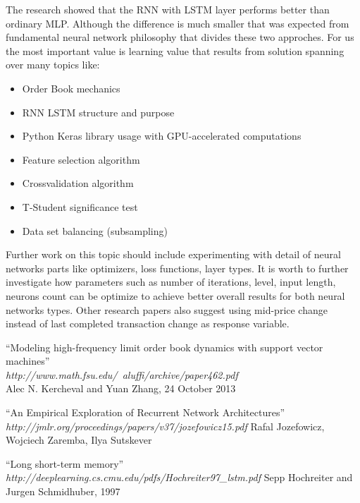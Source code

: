 \documentclass[twoside]{article}
\begin{document}
\begin{multicols}{2}
The research showed that the RNN with LSTM layer performs better than ordinary MLP. Although the difference is much smaller that was expected from fundamental neural network philosophy that divides these two approches.
For us the most important value is learning value that results from solution spanning over many topics like:
\begin{itemize}
\item Order Book mechanics
\item RNN LSTM structure and purpose
\item Python Keras library usage with GPU-accelerated computations
\item Feature selection algorithm
\item Crossvalidation algorithm
\item T-Student significance test
\item Data set balancing (subsampling)
\end{itemize}
Further work on this topic should include experimenting with detail of neural networks parts like optimizers, loss functions, layer types.
It is worth to further investigate how parameters such as number of iterations, level, input length, neurons count  can be optimize to achieve better overall results for both neural networks types. Other research papers also suggest using mid-price change instead of last completed transaction change as response variable.


\begin{thebibliography}{99}

    ``Modeling high-frequency limit order book dynamics with support vector machines'' \\
\emph{http://www.math.fsu.edu/~aluffi/archive/paper462.pdf} \\
	Alec N. Kercheval and Yuan Zhang, 24 October 2013

	``An Empirical Exploration of Recurrent Network Architectures'' \\
\emph{http://jmlr.org/proceedings/papers/v37/jozefowicz15.pdf}
	Rafal Jozefowicz, Wojciech Zaremba, Ilya Sutskever
	
	``Long short-term memory'' \\
\emph{http://deeplearning.cs.cmu.edu/pdfs/Hochreiter97\_lstm.pdf}
	Sepp Hochreiter and Jurgen Schmidhuber, 1997


\end{thebibliography}
\end{multicols}
\end{document}
